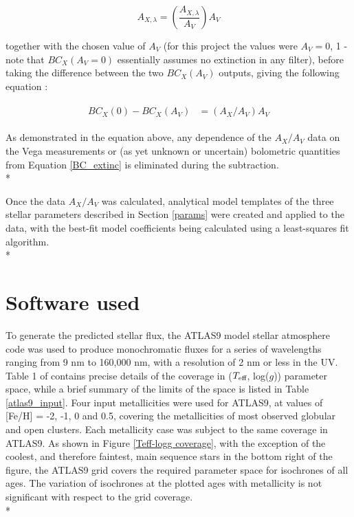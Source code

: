 \documentclass[12pt, a4paper]{report}
\begin{document}
\begin{equation}
A_{X,\lambda} = \left( \frac{A_{X,\lambda}}{A_{V}} \right) A_{V}
\label{ratio_eq}
\end{equation}

together with the chosen value of $A_{V}$ (for this project the values were $A_{V} = 0$, 1 - note that $BC_{X}(A_{V}=0)$ essentially assumes no extinction in any filter), before taking the difference between the two $BC_{X}(A_{V})$ outputs, giving the following equation \citep{2008PASP..120..583G}:

\begin{align}
\begin{split}
BC_{X}(0) - BC_{X}(A_{V}) &= \left(A_{X}/A_{V}\right)A_{V}
\label{BCs_diff}
\end{split}
\end{align}

As demonstrated in the equation above, any dependence of the $A_{X}/A_{V}$ data on the Vega measurements or (as yet unknown or uncertain) bolometric quantities from Equation \ref{BC_extinc} is eliminated during the subtraction. \\*

Once the data $A_{X}/A_{V}$ was calculated, analytical model templates of the three stellar parameters described in Section \ref{params} were created and applied to the data, with the best-fit model coefficients being calculated using a least-squares fit algorithm.\\*

\section{Software used}
To generate the predicted stellar flux, the ATLAS9 model stellar atmosphere code \citep{1993KurCD..13.....K} was used to produce monochromatic fluxes for a series of wavelengths ranging from 9 nm to 160,000 nm, with a resolution of 2 nm or less in the UV.  Table 1 of \cite{2004astro.ph..5087C} contains precise details of the coverage in ($T_{\textnormal{eff}}$, log($g$)) parameter space, while a brief summary  of the limits of the space is listed in Table \ref{atlas9_input}. Four input metallicities were used for ATLAS9, at values of [Fe/H] = -2, -1, 0 and 0.5, covering the metallicities of most observed globular and open clusters. Each metallicity case was subject to the same coverage in ATLAS9. As shown in Figure \ref{Teff-logg coverage}, with the exception of the coolest, and therefore faintest, main sequence stars in the bottom right of the figure, the ATLAS9 grid covers the required parameter space for isochrones of all ages. The variation of isochrones at the plotted ages with metallicity is not significant with respect to the grid coverage. \\*
\end{document}
